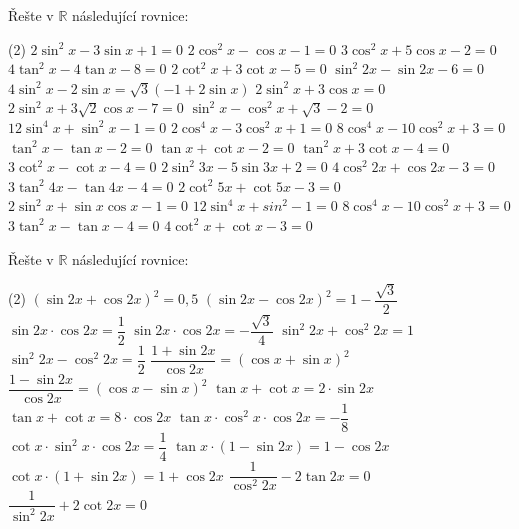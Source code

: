 \documentclass[12pt,a4paper]{article}
\begin{document}
\begin{exercise}
    Řešte v $\mathbb{R}$ následující rovnice:
    \begin{tasks}(2)
        \task $2 \sin^2 x - 3 \sin x + 1 = 0$
        \task $2 \cos^2 x - \cos x - 1 = 0$
        \task $3 \cos^2 x + 5 \cos x - 2 = 0$
        \task $4 \tan^2 x - 4 \tan x - 8 = 0$
        \task $2 \cot^2 x + 3 \cot x - 5 = 0$
        \task $\sin^2 2x - \sin 2x - 6 = 0$
        \task $4 \sin^2 x - 2 \sin x = \sqrt{3}\left(-1 + 2 \sin x\right)$
        \task $2 \sin^2 x + 3 \cos x = 0$
        \task $2 \sin^2 x + 3\sqrt{2} \cos x - 7 = 0$
        \task $\sin^2 x - \cos^2 x + \sqrt{3} - 2 = 0$
        \task $12 \sin^4 x + \sin^2 x - 1 = 0$
        \task $2 \cos^4 x - 3 \cos^2 x + 1 = 0$
        \task $8 \cos^4 x - 10 \cos^2 x + 3 = 0$
        \task $\tan^2 x - \tan x - 2 = 0$
        \task $\tan x + \cot x - 2 = 0$
        \task $\tan^2 x + 3 \cot x - 4 = 0$
        \task $3 \cot^2 x - \cot x - 4 = 0$
        \task $2 \sin^2 3x - 5 \sin 3x + 2 = 0$
        \task $4 \cos^2 2x + \cos 2x - 3 = 0$
        \task $3 \tan^2 4x - \tan 4x - 4 = 0$
        \task $2 \cot^2 5x + \cot 5x - 3 = 0$
        \task $2 \sin^2 x + \sin x \cos x - 1 = 0$
        \task $12 \sin^4 x + sin^2 - 1 = 0$
        \task $8 \cos^4 x - 10 \cos^2 x + 3 = 0$
        \task $3 \tan^2 x - \tan x - 4 = 0$
        \task $4 \cot^2 x + \cot x - 3 = 0$
        \end{tasks}
\end{exercise}


\begin{exercise}
    Řešte v $\mathbb{R}$ následující rovnice:
    \begin{tasks}(2)
        \task $\left(\sin 2x + \cos 2x\right)^2 = 0,5$
        \task $\left(\sin 2x - \cos 2x\right)^2 = 1 - \dfrac{\sqrt{3}}{2}$
        \task $\sin 2x \cdot \cos 2x = \dfrac{1}{2}$
        \task $\sin 2x \cdot \cos 2x = -\dfrac{\sqrt{3}}{4}$
        \task $\sin^2 2x + \cos^2 2x = 1$
        \task $\sin^2 2x - \cos^2 2x = \dfrac{1}{2}$
        \task $\dfrac{1 + \sin 2x}{\cos 2x} = \left(\cos x + \sin x\right)^2$
        \task $\dfrac{1 - \sin 2x}{\cos 2x} = \left(\cos x - \sin x\right)^2$
        \task $\tan x + \cot x = 2 \cdot \sin 2x$
        \task $\tan x + \cot x = 8 \cdot \cos 2x$
        \task $\tan x \cdot \cos^2 x \cdot \cos 2x = -\dfrac{1}{8}$
        \task $\cot x \cdot \sin^2 x \cdot \cos 2x = \dfrac{1}{4}$
        \task $\tan x \cdot \left(1 - \sin 2x\right) = 1 - \cos 2x$
        \task $\cot x \cdot \left(1 + \sin 2x\right) = 1 + \cos 2x$
        \task $\dfrac{1}{\cos^2 2x} - 2\tan 2x = 0$
        \task $\dfrac{1}{\sin^2 2x} + 2\cot 2x = 0$
    \end{tasks}
\end{exercise}
\end{document}
